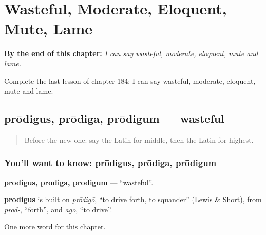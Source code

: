 
\chapter{Wasteful, Moderate, Eloquent, Mute, Lame}
\label{ch:la-wasteful-moderate-eloquent-mute-lame}

\begin{chapteropening}
\textbf{By the end of this chapter:} \emph{I can say wasteful, moderate, eloquent, mute and lame.}

Complete the last lesson of chapter 184: I can say wasteful, moderate, eloquent, mute and lame.
\end{chapteropening}

\section[prōdigus, prōdiga, prōdigum]{prōdigus, prōdiga, prōdigum — wasteful}

\label{lesson:LA-C184-prodigus}



\begin{quote}
Before the new one: say the Latin for middle, then the Latin for highest.
\end{quote}

\subsection*{You'll want to know: prōdigus, prōdiga, prōdigum}
\textbf{prōdigus, prōdiga, prōdigum} — \textquotedblleft{}wasteful\textquotedblright{}.

\begin{cousinweb}
\textbf{prōdigus} is built on \emph{prōdigō}, \textquotedblleft{}to drive forth, to squander\textquotedblright{} (Lewis \& Short), from \emph{prōd-}, \textquotedblleft{}forth\textquotedblright{}, and \emph{agō}, \textquotedblleft{}to drive\textquotedblright{}.
\end{cousinweb}

\begin{grammarlens}[title={What you've built}]
One more word for this chapter.
\end{grammarlens}

